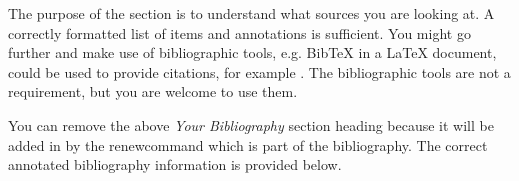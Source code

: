\documentclass[11pt,fleqn,twoside]{article}
\begin{document}
The purpose of the section is to understand what sources you are looking at.  A correctly formatted list of items and annotations is sufficient. You might go further and make use of bibliographic tools, e.g. BibTeX in a LaTeX document, could be used to provide citations, for example \cite{NumericalRecipes} \cite{MarksPaper} \cite[99-101]{FailBlog} \cite{kittenpic_ref}.  The bibliographic tools are not a requirement, but you are welcome to use them.

You can remove the above {\em Your Bibliography} section heading because it will be added in by the renewcommand which is part of the bibliography. The correct annotated bibliography information is provided below.
%
%


\nocite{*} %

\newpage
{}

%
%

\renewcommand{\refname}{Annotated Bibliography}  %
\end{document}
